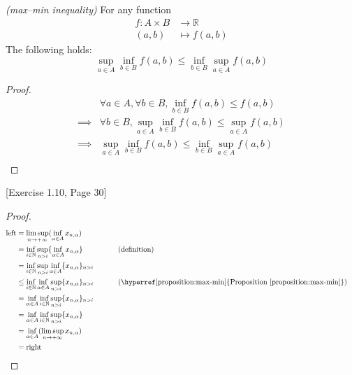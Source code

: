\begin{proposition}
\label{proposition:max-min}
\emph{(max–min inequality)} For any function 
	\begin{align*}
		f \colon A \times B &\to \mathbb{R}\\
		(a, b) &\mapsto f(a, b)
	\end{align*}
The following holds: 
$$\sup_{a \in A} \inf_{b \in B} f(a, b) \leq \inf_{b \in B} \sup_{a \in A} f(a, b)$$
\end{proposition}

\begin{proof}
	\begin{align*}
		&\forall a \in A, \forall b \in B, \inf_{b \in B} f(a, b) \leq f(a, b) \\
		\implies &\forall b \in B, \sup_{a \in A} \inf_{b \in B} f(a, b) \leq \sup_{a \in A} f(a, b) \\
		\implies &\sup_{a \in A} \inf_{b \in B} f(a, b) \leq \inf_{b \in B} \sup_{a \in A} f(a, b) \\
	\end{align*}
\end{proof}

\begin{exercise}
{[Exercise 1.10, Page 30]}
\end{exercise}

\begin{proof}
	\begin{align*}
		\text{left}
        &= \limsup_{n \to +\infty} (\inf_{\alpha \in A} x_{n, \alpha}) \\
        &= \inf_{i \in \mathbb{N}} \sup_{n > i} \{ \inf_{\alpha \in A} x_{n, \alpha} \} 
        && \qquad\text{ (definition) }\\
        &= \inf_{i \in \mathbb{N}} \sup_{n > i} \inf_{\alpha \in A} \{x_{n, \alpha} \}_{n > i} \\
        &\leq \inf_{i \in \mathbb{N}} \inf_{\alpha \in A} \sup_{n > i} \{x_{n, \alpha} \}_{n > i} 
        && \qquad\text{ (\hyperref[proposition:max-min]{Proposition \ref*{proposition:max-min}}) }\\
        &= \inf_{\alpha \in A} \inf_{i \in \mathbb{N}} \sup_{n > i} \{x_{n, \alpha} \}_{n > i} \\
        &= \inf_{\alpha \in A} \inf_{i \in \mathbb{N}} \sup_{n > i} \{x_{n, \alpha} \} \\
        &= \inf_{\alpha \in A} (\limsup_{n \to +\infty} x_{n, \alpha}) \\
        &= \text{right}
	\end{align*}
\end{proof}















